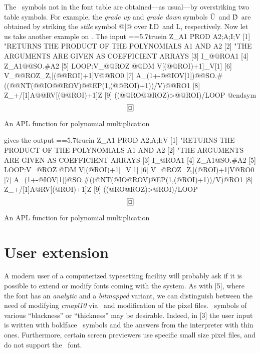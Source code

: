 The \APL\ symbols not in the font table are obtained---as usual---by
overstriking two table symbols.
%
\begintt
   \newbox\firstchar\newskip\charwidth
   \def\overstrike#1#2{\setbox\firstchar=\hbox{#1}\charwidth=\wd\firstchar
                       #1\hskip-\charwidth#2}
\endtt
{}%
For example, the {\it grade up\/} and {\it grade down\/} symbols
\G U\ and \G D\ are obtained by striking the {\it stile\/} symbol
@|@ over \L D\ and \D L, respectively.
%
\begintt
         \def\G#1{\if#1U{\overstrike{\LD}{\AB}}\else      %
                  \if#1D{\overstrike{\DL}{\AB}}\fi\fi}    %
\endtt
Now let us take another example on \APL. The input
\begintt
     =\vbox{\hsize=5.7truein
     \begintt
         [0]   Z_A1 PROD A2;A;I;V
         [1]   "RETURNS THE PRODUCT OF THE POLYNOMIALS A1 AND A2
         [2]   "THE ARGUMENTS ARE GIVEN AS COEFFICIENT ARRAYS
         [3]   I_@@ROA1
         [4]   Z_A1@@SO.#A2
         [5]   LOOP:V_@@ROZ @@DM V[(@@ROI)+1]_V[1]
         [6]   V_@@ROZ_Z,[(@@ROI)+1]V@@RO0
         [7]   A_(1+-@@IOV[1])@@SO.#((@@NT(@@IO@@ROV)@@EP(1,(@@ROI)+1))/V)@@RO1
         [8]   Z_+/[1]A@@RV[(@@ROI)+1]Z
         [9]   ((@@RO@@ROZ)>@@ROI)/LOOP
     @endsym
                    }
     $$\boxit{\boxit{\box0}}$$
     \centerline{\sevenrm An APL function for polynomial multiplication}
\endtt
%
gives the output
%
=\vbox{\hsize=5.7truein
\begintt
      [0]   Z_A1 PROD A2;A;I;V
      [1]   "RETURNS THE PRODUCT OF THE POLYNOMIALS A1 AND A2
      [2]   "THE ARGUMENTS ARE GIVEN AS COEFFICIENT ARRAYS
      [3]   I_@ROA1
      [4]   Z_A1@SO.#A2
      [5]   LOOP:V_@ROZ @DM V[(@ROI)+1]_V[1]
      [6]   V_@ROZ_Z,[(@ROI)+1]V@RO0
      [7]   A_(1+-@IOV[1])@SO.#((@NT(@IO@ROV)@EP(1,(@ROI)+1))/V)@RO1
      [8]   Z_+/[1]A@RV[(@ROI)+1]Z
      [9]   ((@RO@ROZ)>@ROI)/LOOP
\endtt
               }
$$\boxit{\boxit{\box0}}$$
\centerline{\sevenrm An APL function for polynomial multiplication}
%
\section{User extension}
A modern user of a computerized typesetting facility will probably
ask if it is possible to extend or modify fonts coming with the
system. As with [5], where the font has an {\it analytic\/} and a
{\it bitmapped\/} variant, we can distinguish between the need of modifying
{\it cmapl10\/} via \METAFONT\ and modification of the pixel files.
\APL\ symbols of various ``blackness'' or ``thickness'' may be desirable.
Indeed, in [3] the user input is written with boldface \APL\ symbols
and the answers from the interpreter with thin ones. Furthermore,
certain screen previewers use specific small size pixel files, and
do not support the \APL\ font.

